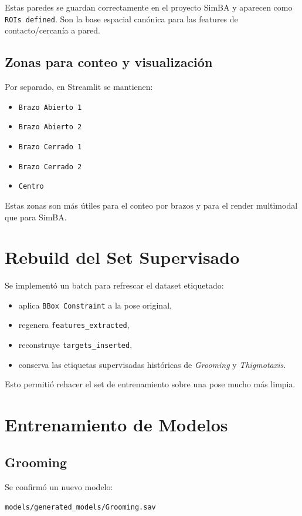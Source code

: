 \documentclass[12pt,a4paper]{article}
\begin{document}
Estas paredes se guardan correctamente en el proyecto SimBA y aparecen como \texttt{ROIs defined}. Son la base espacial can\'onica para las features de contacto/cercan\'ia a pared.

\subsection{Zonas para conteo y visualizaci\'on}
Por separado, en Streamlit se mantienen:
\begin{itemize}[leftmargin=1.5cm]
    \item \texttt{Brazo Abierto 1}
    \item \texttt{Brazo Abierto 2}
    \item \texttt{Brazo Cerrado 1}
    \item \texttt{Brazo Cerrado 2}
    \item \texttt{Centro}
\end{itemize}

Estas zonas son m\'as \'utiles para el conteo por brazos y para el render multimodal que para SimBA.

\section{Rebuild del Set Supervisado}
Se implement\'o un batch para refrescar el dataset etiquetado:
\begin{itemize}[leftmargin=1.5cm]
    \item aplica \texttt{BBox Constraint} a la pose original,
    \item regenera \texttt{features\_extracted},
    \item reconstruye \texttt{targets\_inserted},
    \item conserva las etiquetas supervisadas hist\'oricas de \textit{Grooming} y \textit{Thigmotaxis}.
\end{itemize}

Esto permiti\'o rehacer el set de entrenamiento sobre una pose mucho m\'as limpia.

\section{Entrenamiento de Modelos}
\subsection{Grooming}
Se confirm\'o un nuevo modelo:
\begin{center}
\texttt{models/generated\_models/Grooming.sav}
\end{center}
\end{document}
